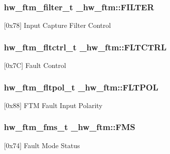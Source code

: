 \subsubsection[{\texorpdfstring{F\+I\+L\+T\+ER}{FILTER}}]{ {\bf hw\+\_\+ftm\+\_\+filter\+\_\+t} \+\_\+hw\+\_\+ftm\+::\+F\+I\+L\+T\+ER}\hypertarget{struct__hw__ftm_a5be8b5f4537f21bd1ed20ea4e046d5a9}{}\label{struct__hw__ftm_a5be8b5f4537f21bd1ed20ea4e046d5a9}
\mbox{[}0x78\mbox{]} Input Capture Filter Control 
\subsubsection[{\texorpdfstring{F\+L\+T\+C\+T\+RL}{FLTCTRL}}]{ {\bf hw\+\_\+ftm\+\_\+fltctrl\+\_\+t} \+\_\+hw\+\_\+ftm\+::\+F\+L\+T\+C\+T\+RL}\hypertarget{struct__hw__ftm_aa3666c5da0f16edad7641c68b898098e}{}\label{struct__hw__ftm_aa3666c5da0f16edad7641c68b898098e}
\mbox{[}0x7C\mbox{]} Fault Control 
\subsubsection[{\texorpdfstring{F\+L\+T\+P\+OL}{FLTPOL}}]{ {\bf hw\+\_\+ftm\+\_\+fltpol\+\_\+t} \+\_\+hw\+\_\+ftm\+::\+F\+L\+T\+P\+OL}\hypertarget{struct__hw__ftm_a24d3e0fd4538522960218ab5968b77c4}{}\label{struct__hw__ftm_a24d3e0fd4538522960218ab5968b77c4}
\mbox{[}0x88\mbox{]} F\+TM Fault Input Polarity 
\subsubsection[{\texorpdfstring{F\+MS}{FMS}}]{ {\bf hw\+\_\+ftm\+\_\+fms\+\_\+t} \+\_\+hw\+\_\+ftm\+::\+F\+MS}\hypertarget{struct__hw__ftm_a5e704f38ed4790b776049512718ff631}{}\label{struct__hw__ftm_a5e704f38ed4790b776049512718ff631}
\mbox{[}0x74\mbox{]} Fault Mode Status 
